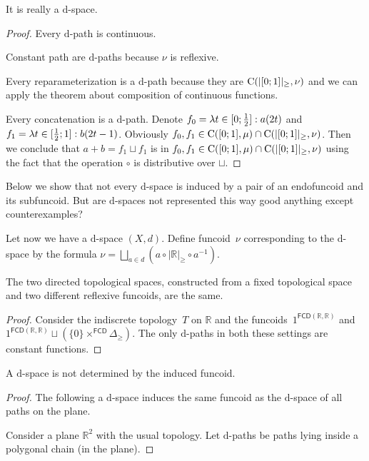 \begin{prop}
It is really a $\mathrm{d}$-space.
\end{prop}

\begin{proof}
Every $\mathrm{d}$-path is continuous.

Constant path are $\mathrm{d}$-paths because $\nu$ is reflexive.

Every reparameterization is a $\mathrm{d}$-path because they are $\mathrm{C}(|[0;1]|_{\geq}, \nu)$ and we can apply the theorem about
composition of continuous functions.

Every concatenation is a $\mathrm{d}$-path. Denote
$f_0 = \lambda t\in[0;\frac{1}{2}]:a(2t)$ and $f_1 = \lambda t\in[\frac{1}{2};1]:b(2t-1)$.
Obviously $f_0,f_1 \in \mathrm{C}([0;1],\mu) \cap \mathrm{C}(|[0;1]|_{\geq}, \nu)$.
Then we conclude that $a+b = f_1\sqcup f_1$ is in $f_0,f_1 \in \mathrm{C}([0;1],\mu) \cap \mathrm{C}(|[0;1]|_{\geq}, \nu)$
using the fact that the operation $\circ$ is distributive over $\sqcup$.
\end{proof}

Below we show that not every $\mathrm{d}$-space is induced by a pair of an endofuncoid and its subfuncoid.
But are $\mathrm{d}$-spaces not represented this way good anything except counterexamples?

Let now we have a $\mathrm{d}$-space $(X,d)$. Define funcoid~$\nu$ corresponding to the $\mathrm{d}$-space by the formula
$\nu = \bigsqcup_{a\in d}(a\circ |\mathbb{R}|_{\geq}\circ a^{-1})$.

\begin{example}
The two directed topological spaces, constructed from a fixed topological space and two different reflexive funcoids,
are the same.
\end{example}

\begin{proof}
Consider the indiscrete topology~$T$ on $\mathbb{R}$ and the funcoids~$1^{\mathsf{FCD}(\mathbb{R},\mathbb{R})}$
and $1^{\mathsf{FCD}(\mathbb{R},\mathbb{R})}\sqcup(\{0\}\times^{\mathsf{FCD}} \Delta_{\geq})$.
The only $\mathrm{d}$-paths in both these settings are constant functions.
\end{proof}

\begin{example}
A $\mathrm{d}$-space is not determined by the induced funcoid.
\end{example}

\begin{proof}
The following a $\mathrm{d}$-space induces the same funcoid as the $\mathrm{d}$-space of all paths on the plane.

Consider a plane $\mathbb{R}^2$ with the usual topology. Let $\mathrm{d}$-paths be paths lying inside a polygonal chain (in the plane).
\end{proof}

